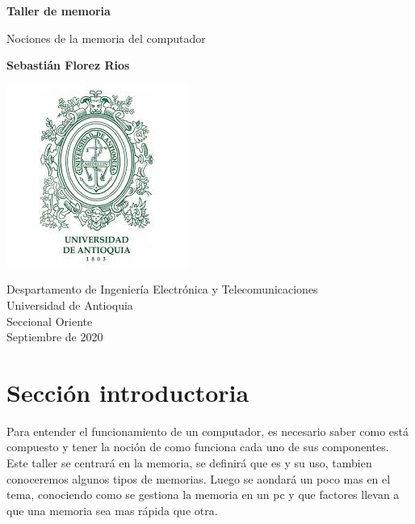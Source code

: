 \documentclass{article}
\begin{document}
\begin{titlepage}
    \begin{center}
        \vspace*{1cm}
            
        \Huge
        \textbf{Taller de memoria}
            
        \vspace{0.5cm}
        \LARGE
        Nociones de la memoria del computador
            
        \vspace{1.5cm}
            
        \textbf{Sebastián Florez Rios}
            
        \vfill
        \includegraphics[]{download.jpg}
        
            
        \Large
        Despartamento de Ingeniería Electrónica y Telecomunicaciones\\
        Universidad de Antioquia\\
        Seccional Oriente\\
        Septiembre de 2020
            
    \end{center}
\end{titlepage}

\tableofcontents

\section{Sección introductoria}
Para entender el funcionamiento de un computador, es necesario saber como está compuesto y tener la noción de como funciona cada uno de sus componentes. Este taller se centrará en la memoria, se definirá que es y su uso, tambien conoceremos algunos tipos de memorias. Luego se aondará un poco mas en el tema, conociendo como se gestiona la memoria en un pc y que factores llevan a que una memoria sea mas rápida que otra.    
\end{document}

